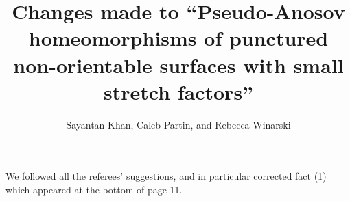 \documentclass[11pt, notitlepage]{article}
\title{Changes made to ``Pseudo-Anosov homeomorphisms of punctured non-orientable surfaces with small stretch factors''}
\author{Sayantan Khan, Caleb Partin, and Rebecca Winarski}
\date{\formatdate{22}{10}{2021}}
\theoremstyle{definition}
\theoremstyle{remark}
\theoremstyle{definition}
\begin{document}
\maketitle

We followed all the referees' suggestions, and in particular corrected fact (1) which appeared at the bottom of page 11.
\end{document}
